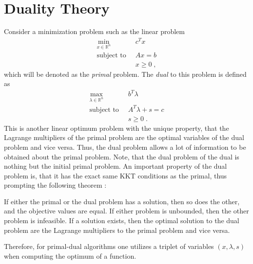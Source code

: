 \section{Duality Theory}
Consider a minimization problem such as the linear problem
\begin{align*}
	\min_{x \in \mathbb{R}^n} \;  & \; c^T x \\
	\text{subject to} \;  & \; A x = b  \\
							& \; x \geq 0 \; ,
\end{align*}
which will be denoted as the \textit{primal} problem. The \textit{dual} to this problem is defined as 
\begin{align*}
	\max_{\lambda \in \mathbb{R}^n} \;  & \; b^T \lambda \\
	\text{subject to} \;  & \; A^T \lambda + s = c  \\
							& \; s \geq 0 \; .
\end{align*}
This is another linear optimum problem with the unique property, that the Lagrange multipliers of the primal problem are the optimal variables of the dual problem and vice versa. Thus, the dual problem allows a lot of information to be obtained about the primal problem. Note, that the dual problem of the dual is nothing but the initial primal problem.
An important property of the dual problem is, that it has the exact same KKT conditions as the primal, thus prompting the following theorem \cite{wright}:
\begin{theorem}
If either the primal or the dual problem has a solution, then so does the other, and the objective values are equal. If either problem is unbounded, then the other problem is infeasible. If a solution exists, then the optimal solution to the dual problem are the Lagrange multipliers to the primal problem and vice versa.
\end{theorem}

Therefore, for primal-dual algorithms one utilizes a triplet of variables $(x , \lambda , s)$ when computing the optimum of a function.

